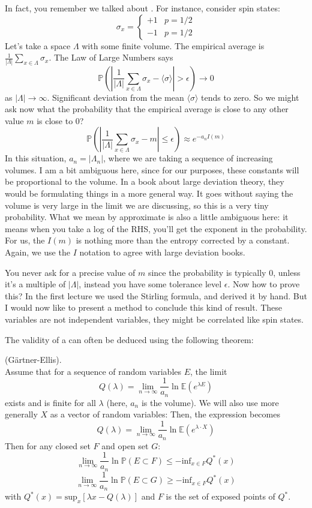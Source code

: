 In fact, you remember we talked about . For instance, consider spin states: 
\[
\sigma_x = 
\begin{cases}
+1 & p = 1/2 \\
-1 & p = 1/2
\end{cases}
\]
Let's take a space $\Lambda$ with some finite volume. The empirical average is $\frac{1}{|\Lambda|} \sum_{x \in \Lambda} \sigma_x$. The Law of Large Numbers says 
\[
\mathbb{P}\left(\left|\frac{1}{|\Lambda|} \sum_{x \in \Lambda} \sigma_x - \langle \sigma \rangle \right| > \epsilon \right) \to 0
\]
as $|\Lambda| \to \infty$. Significant deviation from the mean $\langle \sigma \rangle$ tends to zero. So we might ask now what the probability that the empirical average is close to any other value $m$ is close to $0$? 
\[
\mathbb{P}\left(\left|\frac{1}{|\Lambda|} \sum_{x \in \Lambda} \sigma_x - m\right| \leq \epsilon \right) \approx e^{-a_n I(m)}
\]
In this situation, $a_n = |\Lambda_n|$, where we are taking a sequence of increasing volumes. I am a bit ambiguous here, since for our purposes, these constants will be proportional to the volume. In a book about large deviation theory, they would be formulating things in a more general way. It goes without saying the volume is very large in the limit we are discussing, so this is a very tiny probability. What we mean by approximate is also a little ambiguous here: it means when you take a log of the RHS, you'll get the exponent in the probability. For us, the $I(m)$ is nothing more than the entropy corrected by a constant. Again, we use the $I$ notation to agree with large deviation books. 

You never ask for a precise value of $m$ since the probability is typically $0$, unless it's a multiple of $|\Lambda|$, instead you have some tolerance level $\epsilon$. Now how to prove this? In the first lecture we used the Stirling formula, and derived it by hand. But I would now like to present a method to conclude this kind of result. These variables are not independent variables, they might be correlated like spin states. 

The validity of a  can often be deduced using the following theorem: 
\begin{thm}  (G{\"a}rtner-Ellis). \\
Assume that for a sequence of random variables $E$, the limit
\[
Q(\lambda) = \lim_{n \to \infty}\frac{1}{a_n} \ln \mathbb{E}\left(e^{\lambda E}\right)
\]
exists and is finite for all $\lambda$ (here, $a_n$ is the volume).
We will also use more generally $X$ as a vector of random variables: Then, the expression becomes
\[
Q(\lambda) = \lim_{n \to \infty}\frac{1}{a_n} \ln \mathbb{E}\left(e^{\lambda \cdot X}\right)
\]
Then for any closed set $F$ and open set $G$: 
\[
\lim_{n \to \infty} \frac{1}{a_n} \ln\mathbb{P}(E \subset F) \leq -\text{inf}_{x \in F} Q^*(x)
\]
\[
\lim_{n \to \infty} \frac{1}{a_n} \ln\mathbb{P}(E \subset G) \geq -\text{inf}_{x \in F} Q^*(x)
\]
with $Q^*(x) = \text{sup}_x \left[\lambda x - Q(\lambda)\right]$ and $F$ is the set of exposed points of $Q^*$. 
\end{thm}

